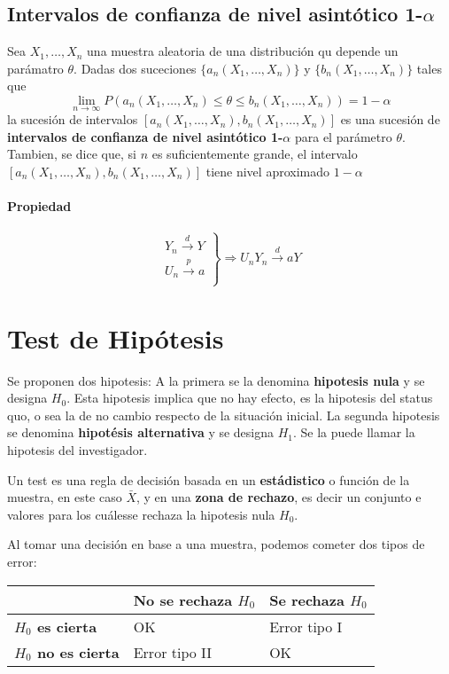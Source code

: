 \subsection{Intervalos de confianza de nivel asintótico 1-\texorpdfstring{$\alpha$}{a}}
Sea $X_1,\dots,X_n$ una muestra aleatoria de una distribución qu depende un parámatro $\theta$. Dadas dos suceciones $\{a_n(X_1,\dots,X_n)\}$ y $\{b_n(X_1,\dots,X_n)\}$ tales que
$$\lim_{n\to\infty} P(a_n(X_1,\dots,X_n)\leq\theta\leq b_n(X_1,\dots,X_n)) = 1-\alpha$$
la sucesión de intervalos $[a_n(X_1,\dots,X_n), b_n(X_1,\dots,X_n)]$ es una sucesión de \textbf{intervalos de confianza de nivel asintótico 1-$\alpha$} para el parámetro $\theta$. Tambien, se dice que, si $n$ es suficientemente grande, el intervalo $[a_n(X_1,\dots,X_n), b_n(X_1,\dots,X_n)]$ tiene nivel aproximado $1-\alpha$


\paragraph{Propiedad}
$$\left.\begin{array}{r}
Y_n\overset{d}{\longrightarrow} Y \\
U_n\overset{p}{\longrightarrow} a \\
\end{array}\right\} \Rightarrow U_nY_n\overset{d}{\longrightarrow} aY$$

\section{Test de Hipótesis}
Se proponen dos hipotesis: A la primera se la denomina \textbf{hipotesis nula} y se designa $H_0$. Esta hipotesis implica que no hay efecto, es la hipotesis del status quo, o sea la de no cambio respecto de la situación inicial. La segunda hipotesis se denomina \textbf{hipotésis alternativa} y se designa $H_1$. Se la puede llamar la hipotesis del investigador.

Un test es una regla de decisión basada en un \textbf{estádistico} o función de la muestra, en este caso $\bar{X}$, y en una \textbf{zona de rechazo}, es decir un conjunto e valores para los cuálesse rechaza la hipotesis nula $H_0$.

Al tomar una decisión en base a una muestra, podemos cometer dos tipos de error:

\begin{center}
\begin{tabular}{|l|l|l|}
	\hline
	& \textbf{No se rechaza $H_0$} & \textbf{Se rechaza $H_0$} \\
	\hline
	\textbf{$H_0$ es cierta} & OK & Error tipo I \\
	\hline
	\textbf{$H_0$ no es cierta} & Error tipo II & OK \\
	\hline
\end{tabular}
\end{center}

